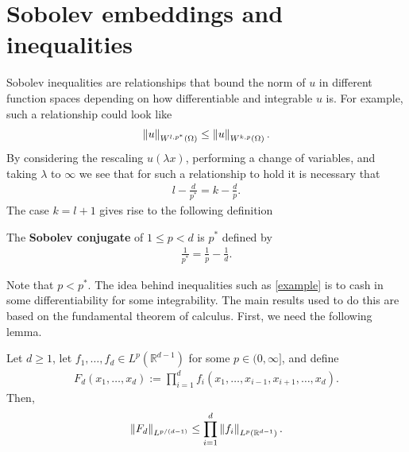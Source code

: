 \documentclass[
    a4paper,
    DIV=14,
    abstract=true,
    numbers=noenddot
]{scrartcl}
\begin{document}
\section{Sobolev embeddings and inequalities}
Sobolev inequalities are relationships that bound the norm of $u$ in different function spaces depending on how differentiable and integrable $u$ is. For example, such a relationship could look like
\begin{align}\label{example}
	\left\lVert u \right\rVert_{W^{ l,p^* }(\Omega)}\leq \left\lVert u \right\rVert_{W^{k,p}(\Omega)}.
\end{align}
By considering the rescaling $u(\lambda x)$, performing a change of variables, and taking $\lambda $ to $\infty$ we see that for such a relationship to hold it is necessary that
\begin{align}\label{conjugate}
	l-     \frac{d}{p^*}=k-\frac{d}{p}  .
\end{align}
The case $k=l+1$ gives rise to the following definition
\begin{definition}
	The \textbf{Sobolev conjugate } of $1\leq p<d$ is $p^*$ defined by
	\begin{align*}
		\frac{1}{p^*}= \frac{1}{p} -\frac{1}{d} .
	\end{align*}
\end{definition}
Note that $p<p^*$. The idea behind inequalities such as \eqref{example}  is to cash in some differentiability for some integrability. The main results used to do this are based on the fundamental theorem of calculus. First, we need the following lemma.
\begin{lemma}\label{whitney} Let $d \geq 1$, let $f_1, \ldots, f_d \in L^p\left(\mathbb{R}^{d-1}\right)$ for some $p \in (0,\infty]$, and define
	\begin{align*}
		F_d\left(x_1, \ldots, x_d\right):=\prod_{i=1}^d f_i\left(x_1, \ldots, x_{i-1}, x_{i+1}, \ldots, x_d\right).
	\end{align*}
	Then,
	\begin{align}\label{loomis ineq}
		\left\lVert F_d \right\rVert_{L^{p/(d-1)}}\leq\prod_{i=1}^d\left\|f_i\right\|_{L^p\left(\mathbb{R}^{d-1}\right)} .
	\end{align}
\end{lemma}
\end{document}
